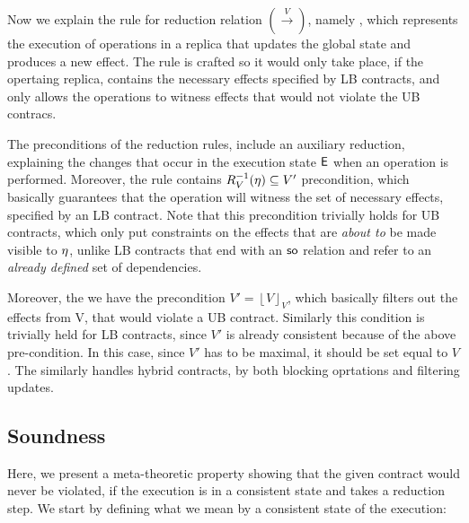 
Now we explain the rule for reduction relation $(\xrightarrow{V})$,
namely , which represents the execution of operations
in a replica that updates the global state and produces a new
effect. The rule is crafted so it would only take place, if the
opertaing replica, contains the necessary effects specified by LB
contracts, and only allows the operations to witness effects that would
not violate the UB contracs.



The preconditions of the reduction rules, include an auxiliary
reduction, explaining the changes that occur in the execution state ${\normalfont \textsf{E}}$
when an operation is performed. 
Moreover, the rule contains
$R_V^{-1}(\eta)\subseteq V'$ precondition, which basically guarantees
that the operation will witness the set of necessary effects, specified
by an LB contract. Note that this precondition trivially holds for UB
contracts, which only put constraints on the effects that are
\emph{about to} be made
visible to $\eta$, unlike LB contracts that end with an ${\normalfont \textsf{so}}$ relation and
refer to an \emph{already defined} set of dependencies. 

Moreover, the we have the precondition $V' = \left \lfloor V \right
\rfloor_V$, which basically filters out the effects from V, that would
violate a UB contract. Similarly this condition is trivially held for LB
contracts, since $V'$ is
already consistent because of the above pre-condition. In this case,
since $V'$ has
to be maximal, it should be set equal to $V$. The 
similarly handles hybrid contracts, by both blocking oprtations and
filtering updates.

\subsection{Soundness}
\label{subsec:sound}
Here, we present a meta-theoretic property showing that the given contract would never be
violated, if the execution is in a consistent state and takes a reduction
step. We start by defining what we mean by a consistent state of the
execution: 


